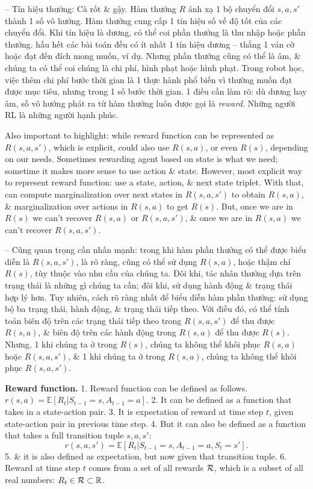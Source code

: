 \documentclass{article}
\begin{document}
\begin{itemize}
\begin{itemize}
        -- {\sf Tín hiệu thưởng: Cà rốt \& gậy.} Hàm thưởng $R$ ánh xạ 1 bộ chuyển đổi $s,a,s'$ thành 1 số vô hướng. Hàm thưởng cung cấp 1 tín hiệu số về độ tốt của các chuyển đổi. Khi tín hiệu là dương, có thể coi phần thưởng là thu nhập hoặc phần thưởng. hầu hết các bài toán đều có ít nhất 1 tín hiệu dương -- thắng 1 ván cờ hoặc đạt đến đích mong muốn, ví dụ. Nhưng phần thưởng cũng có thể là âm, \& chúng ta có thể coi chúng là chi phí, hình phạt hoặc hình phạt. Trong robot học, việc thêm chi phí bước thời gian là 1 thực hành phổ biến vì thường muốn đạt được mục tiêu, nhưng trong 1 số bước thời gian. 1 điều cần làm rõ: dù dương hay âm, số vô hướng phát ra từ hàm thưởng luôn được gọi là {\it reward}. Những người RL là những người hạnh phúc.

        Also important to highlight: while reward function can be represented as $R(s,a,s')$, which is explicit, could also use $R(s,a)$, or even $R(s)$, depending on our needs. Sometimes rewarding agent based on state is what we need; sometime it makes more sense to use action \& state. However, most explicit way to represent reward function: use a state, action, \& next state triplet. With that, can compute marginalization over next states in $R(s,a,s')$ to obtain $R(s,a)$, \& marginalization over actions in $R(s,a)$ to get $R(s)$. But, once we are in $R(s)$ we can't recover $R(s,a)$ or $R(s,a,s')$, \& once we are in $R(s,a)$ we can't recover $R(s,a,s')$.

        -- Cũng quan trọng cần nhấn mạnh: trong khi hàm phần thưởng có thể được biểu diễn là $R(s,a,s')$, là rõ ràng, cũng có thể sử dụng $R(s,a)$, hoặc thậm chí $R(s)$, tùy thuộc vào nhu cầu của chúng ta. Đôi khi, tác nhân thưởng dựa trên trạng thái là những gì chúng ta cần; đôi khi, sử dụng hành động \& trạng thái hợp lý hơn. Tuy nhiên, cách rõ ràng nhất để biểu diễn hàm phần thưởng: sử dụng bộ ba trạng thái, hành động, \& trạng thái tiếp theo. Với điều đó, có thể tính toán biên độ trên các trạng thái tiếp theo trong $R(s,a,s')$ để thu được $R(s,a)$, \& biên độ trên các hành động trong $R(s,a)$ để thu được $R(s)$. Nhưng, 1 khi chúng ta ở trong $R(s)$, chúng ta không thể khôi phục $R(s,a)$ hoặc $R(s,a,s')$, \& 1 khi chúng ta ở trong $R(s,a)$, chúng ta không thể khôi phục $R(s,a,s')$.

        {\bf Reward function.} 1. Reward function can be defined as follows. $r(s,a) = \mathbb{E}[R_t|S_{t-1} = s,A_{t-1} = a]$. 2. It can be defined as a function that takes in a state-action pair. 3. It is expectation of reward at time step $t$, given state-action pair in previous time step. 4. But it can also be defined as a function that takes a full transition tuple $s,a,s'$:
        \begin{equation*}
            r(s,a,s') = \mathbb{E}[R_t|S_{t-1} = s,A_{t-1} = a,S_t = s'].
        \end{equation*}
        5.  \& it is also defined as expectation, but now given that transition tuple. 6. Reward at time step $t$ comes from a set of all rewards ${\cal R}$, which is a subset of all real numbers: $R_t\in{\cal R}\subset\mathbb{R}$.


\end{itemize}
\end{itemize}
\end{document}
